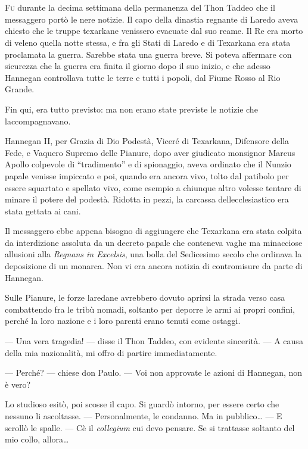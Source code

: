 	\chapter{\phantom{title}}

\lettrine{F}{u} durante la decima settimana della permanenza del Thon Taddeo che il
messaggero portò le nere notizie. Il capo della dinastia regnante di
Laredo aveva chiesto che le truppe texarkane venissero evacuate dal suo
reame. Il Re era morto di veleno quella notte stessa, e fra gli Stati di
Laredo e di Texarkana era stata proclamata la guerra. Sarebbe stata una
guerra breve. Si poteva affermare con sicurezza che la guerra era finita
il giorno dopo il suo inizio, e che adesso Hannegan controllava tutte le
terre e tutti i popoli, dal Fiume Rosso al Rio Grande.

Fin qui, era tutto previsto: ma non erano state previste le notizie che
l\textquotesingle accompagnavano.

Hannegan II, per Grazia di Dio Podestà, Viceré di Texarkana, Difensore
della Fede, e Vaquero Supremo delle Pianure, dopo aver giudicato
monsignor Marcus Apollo colpevole di ``tradimento'' e di spionaggio,
aveva ordinato che il Nunzio papale venisse impiccato e poi, quando era
ancora vivo, tolto dal patibolo per essere squartato e spellato vivo,
come esempio a chiunque altro volesse tentare di minare il potere del
podestà. Ridotta in pezzi, la carcassa
dell\textquotesingle ecclesiastico era stata gettata ai cani.

Il messaggero ebbe appena bisogno di aggiungere che Texarkana era stata
colpita da interdizione assoluta da un decreto papale che conteneva
vaghe ma minacciose allusioni alla \emph{Regnans in Excelsis}, una bolla
del Sedicesimo secolo che ordinava la deposizione di un monarca. Non vi
era ancora notizia di contromisure da parte di Hannegan.

Sulle Pianure, le forze laredane avrebbero dovuto aprirsi la strada
verso casa combattendo fra le tribù nomadi, soltanto per deporre le armi
ai propri confini, perché la loro nazione e i loro parenti erano tenuti
come ostaggi.

--- Una vera tragedia! --- disse il Thon Taddeo, con evidente sincerità.
--- A causa della mia nazionalità, mi offro di partire immediatamente.

--- Perché? --- chiese don Paulo. --- Voi non approvate le azioni di
Hannegan, non è vero?

Lo studioso esitò, poi scosse il capo. Si guardò intorno, per essere
certo che nessuno li ascoltasse. --- Personalmente, le condanno. Ma in
pubblico\ldots{} --- E scrollò le spalle. --- C\textquotesingle è il
\emph{collegium} cui devo pensare. Se si trattasse soltanto del mio
collo, allora\ldots{}

